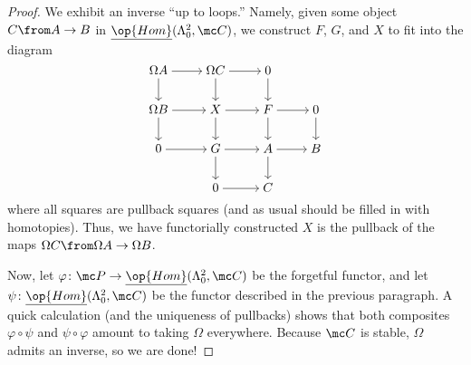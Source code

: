 \documentclass[../notes.tex]{subfiles}
\begin{document}
\begin{proof}
	We exhibit an inverse ``up to loops.'' Namely, given some object $C\from A\to B$ in $\underline{\op{Hom}}(\Lambda^2_0,\mc C)$, we construct $F$, $G$, and $X$ to fit into the diagram
	\[\begin{tikzcd}[cramped]
		{\Omega A} & {\Omega C} & 0 \\
		{\Omega B} & X & F & 0 \\
		0 & G & A & B \\
		& 0 & C
		\arrow[from=1-1, to=1-2]
		\arrow[from=1-1, to=2-1]
		\arrow[from=1-2, to=1-3]
		\arrow[from=1-2, to=2-2]
		\arrow[from=1-3, to=2-3]
		\arrow[from=2-1, to=2-2]
		\arrow[from=2-1, to=3-1]
		\arrow[from=2-2, to=2-3]
		\arrow[from=2-2, to=3-2]
		\arrow[from=2-3, to=2-4]
		\arrow[from=2-3, to=3-3]
		\arrow[from=2-4, to=3-4]
		\arrow[from=3-1, to=3-2]
		\arrow[from=3-2, to=3-3]
		\arrow[from=3-2, to=4-2]
		\arrow[from=3-3, to=3-4]
		\arrow[from=3-3, to=4-3]
		\arrow[from=4-2, to=4-3]
	\end{tikzcd}\]
	where all squares are pullback squares (and as usual should be filled in with homotopies). Thus, we have functorially constructed $X$ is the pullback of the maps $\Omega C\from\Omega A\to\Omega B$.

	Now, let $\varphi\colon\mc P\to\underline{\op{Hom}}(\Lambda^2_0,\mc C)$ be the forgetful functor, and let $\psi\colon\underline{\op{Hom}}(\Lambda^2_0,\mc C)$ be the functor described in the previous paragraph. A quick calculation (and the uniqueness of pullbacks) shows that both composites $\varphi\circ\psi$ and $\psi\circ\varphi$ amount to taking $\Omega$ everywhere. Because $\mc C$ is stable, $\Omega$ admits an inverse, so we are done!
\end{proof}
\end{document}
